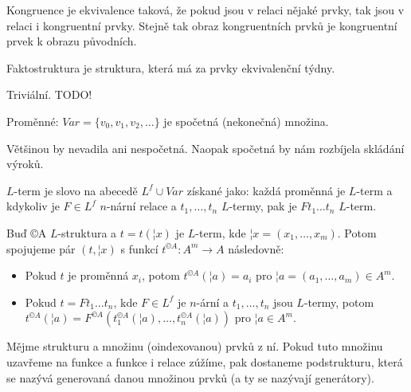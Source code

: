 \documentclass[12pt]{article}                   %
\begin{document}
        \begin{definice}
            Kongruence je ekvivalence taková, že pokud jsou v relaci nějaké prvky, tak jsou v relaci i kongruentní prvky. Stejně tak obraz kongruentních prvků je kongruentní prvek k obrazu původních.

            Faktostruktura je struktura, která má za prvky ekvivalenční týdny.
        \end{definice}

        \begin{definice}
           Triviální. TODO! 
        \end{definice}

        \begin{definice}
            Proměnné: $Var = \{v_0, v_1, v_2, …\}$ je spočetná (nekonečná) množina.

            \begin{poznamkain}
                Většinou by nevadila ani nespočetná. Naopak spočetná by nám rozbíjela skládání výroků.
            \end{poznamkain}

            $L$-term je slovo na abecedě $L^f \cup Var$ získané jako: každá proměnná je $L$-term a kdykoliv je $F \in L^f$ $n$-nární relace a $t_1, …, t_n$ $L$-termy, pak je $Ft_1…t_n$ $L$-term.
        \end{definice}

        \begin{definice}
            Buď ©A $L$-struktura a $t=t(¦x)$ je $L$-term, kde $¦x = (x_1, …, x_m)$. Potom spojujeme pár $(t, ¦x)$ s funkcí $t^{©A}: A^m \rightarrow A$ následovně:

            \begin{itemize}
                \item Pokud $t$ je proměnná $x_i$, potom $t^{©A}(¦a) = a_i$ pro $¦a = (a_1, …, a_m) \in A^m$.
                \item Pokud $t = Ft_1…t_n$, kde $F \in L^f$ je $n$-ární a $t_1, …, t_n$ jsou $L$-termy, potom $t^{©A}(¦a) = F^{©A}(t_1^{©A}(¦a), …, t_n^{©A}(¦a))$ pro $¦a \in A^m$.
            \end{itemize}
        \end{definice}

        \begin{definice}
            Mějme strukturu a množinu (oindexovanou) prvků z ní. Pokud tuto množinu uzavřeme na funkce a funkce i relace zúžíme, pak dostaneme podstrukturu, která se nazývá generovaná danou množinou prvků (a ty se nazývají generátory).
        \end{definice}
\end{document}
